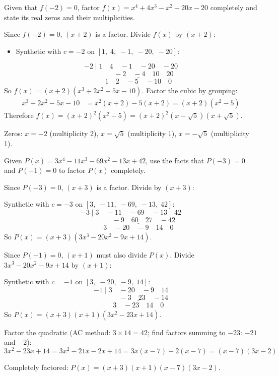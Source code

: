 \documentclass{ximera}
\begin{document}
\begin{problem}
Given that $f(-2) = 0$, factor $f(x) = x^4+4x^3-x^2-20x-20$ completely and state its real zeros and their multiplicities.

\begin{solution}
Since $f(-2)=0$, $(x+2)$ is a factor. Divide $f(x)$ by $(x+2)$:
\begin{itemize}
  \item Synthetic with $c=-2$ on $[1,\;4,\;-1,\;-20,\;-20]$:
\end{itemize}
$$-2 \mid 1 \quad 4 \quad -1 \quad -20 \quad -20$$
$$\phantom{-2 \mid}\underline{\phantom{1}\quad -2 \quad -4 \quad 10 \quad 20}$$
$$\phantom{-2 \mid} 1 \quad 2 \quad -5 \quad -10 \quad 0$$
So $f(x) = (x+2)(x^3+2x^2-5x-10)$. Factor the cubic by grouping:
\begin{align*}
  x^3+2x^2-5x-10 &= x^2(x+2)-5(x+2) = (x+2)(x^2-5)
\end{align*}
Therefore $f(x) = (x+2)^2(x^2-5) = (x+2)^2(x-\sqrt{5})(x+\sqrt{5})$.

Zeros: $x = -2$ (multiplicity 2), $x = \sqrt{5}$ (multiplicity 1), $x = -\sqrt{5}$ (multiplicity 1).
\end{solution}
\end{problem}


\begin{problem}
Given $P(x) = 3x^4 - 11x^3 - 69x^2 - 13x+42$, use the facts that $P(-3) = 0$ and $P(-1) = 0$ to factor $P(x)$ completely.

\begin{solution}
Since $P(-3)=0$, $(x+3)$ is a factor. Divide by $(x+3)$:

Synthetic with $c=-3$ on $[3,\;-11,\;-69,\;-13,\;42]$:
$$-3 \mid 3 \quad -11 \quad -69 \quad -13 \quad 42$$
$$\phantom{-3 \mid}\underline{\phantom{3}\quad -9 \quad 60 \quad 27 \quad -42}$$
$$\phantom{-3 \mid} 3 \quad -20 \quad -9 \quad 14 \quad 0$$
So $P(x) = (x+3)(3x^3-20x^2-9x+14)$.

Since $P(-1)=0$, $(x+1)$ must also divide $P(x)$. Divide $3x^3-20x^2-9x+14$ by $(x+1)$:

Synthetic with $c=-1$ on $[3,\;-20,\;-9,\;14]$:
$$-1 \mid 3 \quad -20 \quad -9 \quad 14$$
$$\phantom{-1 \mid}\underline{\phantom{3}\quad -3 \quad 23 \quad -14}$$
$$\phantom{-1 \mid} 3 \quad -23 \quad 14 \quad 0$$
So $P(x) = (x+3)(x+1)(3x^2-23x+14)$.

Factor the quadratic (AC method: $3 \times 14 = 42$; find factors summing to $-23$: $-21$ and $-2$):
$$3x^2-23x+14 = 3x^2-21x-2x+14 = 3x(x-7)-2(x-7) = (x-7)(3x-2)$$

Completely factored: $P(x) = (x+3)(x+1)(x-7)(3x-2)$.
\end{solution}
\end{problem}
\end{document}
